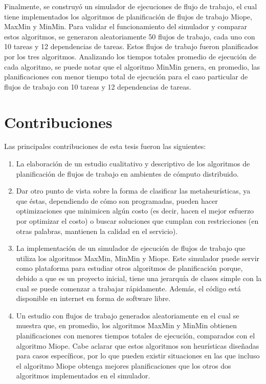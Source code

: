 Finalmente, se construyó un simulador de ejecuciones de flujo de trabajo, el cual tiene implementados los algoritmos de planificación de flujos de trabajo Miope, MaxMin y MinMin. Para validar el funcionamiento del simulador y comparar estos algoritmos, se generaron aleatoriamente 50 flujos de trabajo, cada uno con 10 tareas y 12 dependencias de tareas. Estos flujos de trabajo fueron planificados por los tres algoritmos. Analizando los tiempos totales promedio de ejecución de cada algoritmo, se puede notar que el algoritmo MinMin genera, en promedio, las planificaciones con menor tiempo total de ejecución para el caso particular de flujos de trabajo con 10 tareas y 12 dependencias de tareas.

\section{Contribuciones}
Las principales contribuciones de esta tesis fueron las siguientes:
\begin{enumerate}
\item La elaboración de un estudio cualitativo y descriptivo de los algoritmos de planificación de flujos de trabajo en ambientes de cómputo distribuido.
\item Dar otro punto de vista sobre la forma de clasificar las metaheurísticas, ya que éstas, dependiendo de cómo son programadas, pueden hacer optimizaciones que minimicen algún costo (es decir, hacen el mejor esfuerzo por optimizar el costo) o buscar soluciones que cumplan con restricciones (en otras palabras, mantienen la calidad en el servicio).
\item La implementación de un simulador de ejecución de flujos de trabajo que utiliza los algoritmos MaxMin, MinMin y Miope. Este simulador puede servir como plataforma para estudiar otros algoritmos de planificación porque, debido a que es un proyecto inicial, tiene una jerarquía de clases simple con la cual se puede comenzar a trabajar rápidamente. Además, el código está disponible en internet en forma de software libre.
\item Un estudio con flujos de trabajo generados aleatoriamente en el cual se muestra que, en promedio, los algoritmos MaxMin y MinMin obtienen planificaciones con menores tiempos totales de ejecución, comparados con el algoritmo Miope. Cabe aclarar que estos algoritmos son heurísticas diseñadas para casos específicos, por lo que pueden existir situaciones en las que incluso el algoritmo Miope obtenga mejores planificaciones que los otros dos algoritmos implementados en el simulador.
\end{enumerate}

